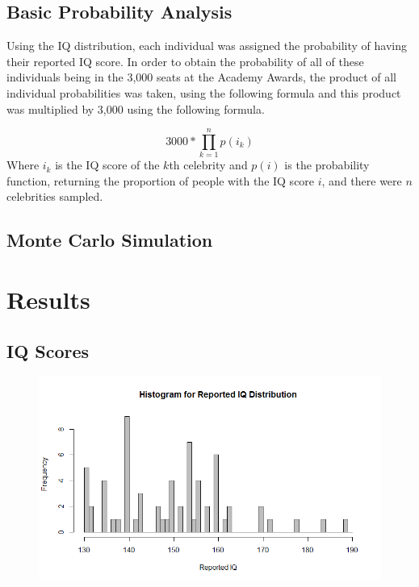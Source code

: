 \documentclass[12pt,letterpaper,titlepage,oneside]{article}
\begin{document}
\subsection{Basic Probability Analysis}
\label{probanal}
Using the IQ distribution, each individual was assigned the probability of having their reported IQ score. In order to obtain the probability of all of these individuals being in the 3,000 seats at the Academy Awards, the product of all individual probabilities was taken, using the following formula and this product was multiplied by 3,000 using the following formula.

\begin{equation}
3000 * \prod_{k=1}^n p(i_k)
\end{equation}
Where $i_k$ is the IQ score of the $k$th celebrity and $p(i)$ is the probability function, returning the proportion of people with the IQ score $i$, and there were $n$ celebrities sampled.

\subsection{Monte Carlo Simulation} 

\section{Results}
\subsection{IQ Scores}

\begin{figure}[h!]
\caption{}
\label{iqhist}
\includegraphics[scale=.5]{histogram.png}
\end{figure}
\end{document}
